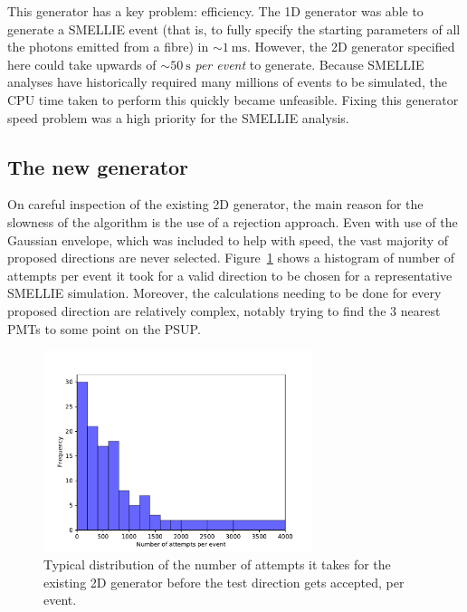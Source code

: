 This generator has a key problem: efficiency. The 1D generator was able to generate a SMELLIE event (that is, to fully specify the starting parameters of all the photons emitted from a fibre) in $\sim\SI{1}{\milli\second}$. However, the 2D generator specified here could take upwards of $\sim\SI{50}{\second}$ \textit{per event} to generate. Because SMELLIE analyses have historically required many millions of events to be simulated, the CPU time taken to perform this quickly became unfeasible. Fixing this generator speed problem was a high priority for the SMELLIE analysis.

\subsection{The new generator}\label{sect:new_gen}
On careful inspection of the existing 2D generator, the main reason for the slowness of the algorithm is the use of a rejection approach. Even with use of the Gaussian envelope, which was included to help with speed, the vast majority of proposed directions are never selected. Figure~\ref{fig:num_attempts} shows a histogram of number of attempts per event it took for a valid direction to be chosen for a representative SMELLIE simulation. Moreover, the calculations needing to be done for every proposed direction are relatively complex, notably trying to find the 3 nearest PMTs to some point on the PSUP.

\begin{figure}
    \centering
    \includegraphics[width=0.7\textwidth]{4_SMELLIESimulation/images/2D_generator_num_attempts_nicer.pdf}
    \caption[Number of attempts taken for existing 2D SMELLIE generator to accept direction]{Typical distribution of the number of attempts it takes for the existing 2D generator before the test direction gets accepted, per event.}
    \label{fig:num_attempts}
\end{figure}

